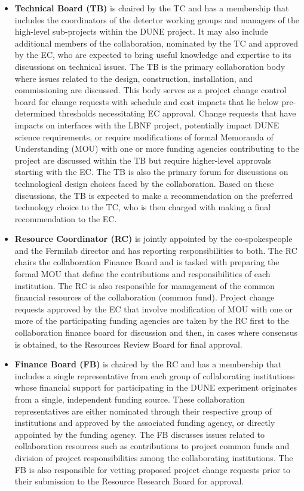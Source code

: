 \begin{itemize}
  \item \textbf{Technical Board (TB)} is chaired by the TC and has a membership that includes the coordinators of the detector working groups and managers of the high-level sub-projects within the DUNE project.  It may also include additional members of the collaboration, nominated by the TC and approved by the EC, who are expected to bring useful knowledge and expertise to its discussions on technical issues.  The TB is the primary collaboration body where issues related to the design, construction, installation, and commissioning are discussed.  This body serves as a project change control board for change requests with schedule and cost impacts that lie below pre-determined thresholds necessitating EC approval.  Change requests that have impacts on interfaces with the LBNF project, potentially impact DUNE science requirements, or require modifications of formal Memoranda of Understanding (MOU) with one or more funding agencies contributing to the project are discussed within the TB but require higher-level approvals starting with the EC.  The TB is also the primary forum for discussions on technological design choices faced by the collaboration.  Based on these discussions, the TB is expected to make a recommendation on the preferred technology choice to the TC, who is then charged with making a final recommendation to the EC.           
  \item \textbf{Resource Coordinator (RC)} is jointly appointed by the co-spokespeople and the Fermilab director and has reporting responsibilities to both.  The RC chairs the collaboration Finance Board and is tasked with preparing the formal MOU that define the contributions and responsibilities of each institution.  The RC is also responsible for management of the common financial resources of the collaboration (common fund).  Project change requests approved by the EC that involve modification of MOU with one or more of the participating funding agencies are taken by the RC first to the collaboration finance board for discussion and then, in cases where consensus is obtained, to the Resources Review Board for final approval.  
  \item \textbf{Finance Board (FB)} is chaired by the RC and has a membership that includes a single representative from each group of collaborating institutions whose financial support for participating in the DUNE experiment originates from a single, independent funding source.  These collaboration representatives are either nominated through their respective group of institutions and approved by the associated funding agency, or directly appointed by the funding agency.  The FB discusses issues related to  collaboration resources such as contributions to project common funds and division of project responsibilities among the collaborating institutions.  The FB is also responsible for vetting proposed project change requests prior to their submission to the Resource Research Board for approval.   

\end{itemize}
